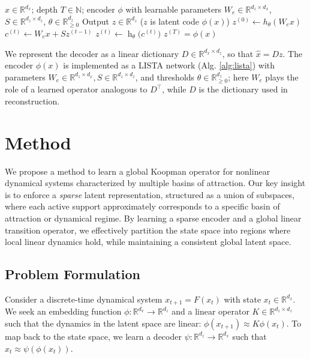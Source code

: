 \begin{algorithm}[ht]
\caption{LISTA Encoder (Forward Pass)}
\label{alg:lista}
\begin{algorithmic}[1]
\REQUIRE $x \in \mathbb{R}^{d_x}$; depth $T \in \mathbb{N}$; encoder $\phi$ with learnable parameters $W_e \in \mathbb{R}^{d_z \times d_x}$, $S \in \mathbb{R}^{d_z \times d_z}$, $\theta \in \mathbb{R}^{d_z}_{\ge 0}$
\ENSURE Output $z \in \mathbb{R}^{d_z}$ ($z$ is latent code $\phi(x)$)
\STATE $z^{(0)} \gets h_\theta (W_e x)$
    \STATE $c^{(t)} \gets W_e x + Sz^{(t-1)}$ 
    \STATE $z^{(t)} \gets \operatorname{h}_{\theta} \big(c^{(t)}\big)$
\ENDFOR
\RETURN $z^{(T)} = \phi(x)$
\end{algorithmic}
\end{algorithm}

We represent the decoder as a linear dictionary $D \in \mathbb{R}^{d_x \times d_z}$, so that $\hat{x} = D z$. The encoder $\phi(x)$ is implemented as a LISTA network (Alg. \ref{alg:lista}) with parameters $W_e \in \mathbb{R}^{d_z \times d_x}, S \in \mathbb{R}^{d_z \times d_z}$, and thresholds $\theta \in \mathbb{R}^{d_z}_{\ge 0}$; here $W_e$ plays the role of a learned operator analogous to $D^\top$, while $D$ is the dictionary used in reconstruction.

\section{Method}
\label{sec:method}

We propose a method to learn a global Koopman operator for nonlinear dynamical systems characterized by multiple basins of attraction. Our key insight is to enforce a \textit{sparse} latent representation, structured as a union of subspaces, where each active support approximately corresponds to a specific basin of attraction or dynamical regime. By learning a sparse encoder and a global linear transition operator, we effectively partition the state space into regions where local linear dynamics hold, while maintaining a consistent global latent space.

\subsection{Problem Formulation}
Consider a discrete-time dynamical system $x_{t+1} = F(x_t)$ with state $x_t \in \mathbb{R}^{d_x}$. We seek an embedding function $\phi: \mathbb{R}^{d_x} \to \mathbb{R}^{d_z}$ and a linear operator $K \in \mathbb{R}^{d_z \times d_z}$ such that the dynamics in the latent space are linear: $\phi(x_{t+1}) \approx K \phi(x_t)$. To map back to the state space, we learn a decoder $\psi: \mathbb{R}^{d_z} \to \mathbb{R}^{d_x}$ such that $x_t \approx \psi(\phi(x_t))$.

